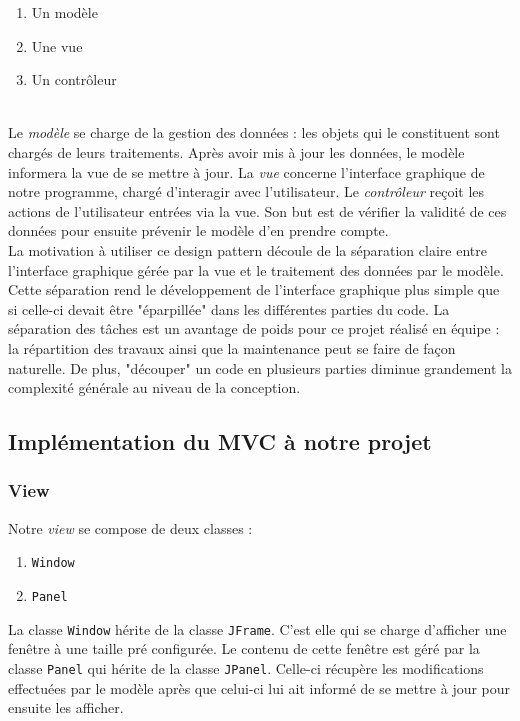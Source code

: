 \begin{enumerate}
\item Un modèle
\item Une vue
\item Un contr\^oleur
\end{enumerate}\ \\
Le \textit{modèle} se charge de la gestion des données : les objets qui le constituent sont 
chargés de leurs traitements. Après avoir mis à jour les données, le modèle informera la  
vue de se mettre à jour. La \textit{vue} concerne l'interface graphique de notre programme, 
chargé d'interagir avec l'utilisateur. Le \textit{contr\^oleur} reçoit les actions de 
l'utilisateur entrées via la vue. Son but est de vérifier la validité de ces données pour 
ensuite prévenir le modèle d'en prendre compte.\\

La motivation à utiliser ce design pattern découle de la séparation claire entre 
l'interface graphique gérée par la vue et le traitement des données par le modèle. 
Cette séparation rend le développement de l'interface graphique plus simple que si
celle-ci devait être "éparpillée" dans les différentes parties du code. La 
séparation des tâches est un avantage de poids pour ce projet réalisé en équipe : la
répartition des travaux ainsi que la maintenance peut se faire de façon naturelle. De 
plus, "découper" un code en plusieurs parties diminue grandement la complexité générale 
au niveau de la conception.


	\subsection{Implémentation du MVC à notre projet}
		\subsubsection{View}
		Notre \textit{view} se compose de deux classes : 
		\begin{multicols}{2}
        \begin{enumerate}
            \item \texttt{Window}
            \item \texttt{Panel}
        \end{enumerate}
	    \end{multicols}
	    La classe \texttt{Window} hérite de la classe \texttt{JFrame}. C'est elle 
	    qui se charge d'afficher une fenêtre à une taille pré configurée. Le contenu
	    de cette fenêtre est géré par la classe \texttt{Panel} qui hérite de la 
	    classe \texttt{JPanel}. Celle-ci récupère les modifications effectuées par le 
	    modèle après que celui-ci lui ait informé de se mettre à jour pour ensuite 
	    les afficher.
	    
